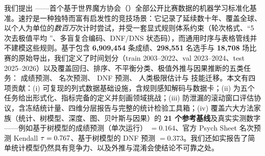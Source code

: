 我们提出 \wcabench{}——首个基于世界魔方协会（\wca）全部公开比赛数据的机器学习标准化基准。速拧是一种独特而富有启发性的竞技场景：它记录了延续数十年、覆盖全球、以个人为单位的\emph{数百万}次计时尝试，并受一套显式规则体系约束（轮次格式、“5 次去极值平均 ”、多盲复合编码、DNF/DNS 状态码），而通用时序与表格管线并不建模这些规则。基于包含 \textbf{6{,}909{,}454} 条成绩、\textbf{298{,}551} 名选手与 \textbf{18{,}708} 场比赛的原始导出，我们定义了时间划分（train 2003--2022、val 2023--2024、test 2025--2026）以及覆盖回归、排序、不平衡分类、极值外推与因果推断的五类任务： 成绩预测、 名次预测、 DNF 预测、 人类极限估计与  技能迁移。本文有四项贡献：(i) 可复现的列式数据基础设施，含规则感知解码与数据卡；(ii) 为五个任务给出形式化、指标完备的定义并刻画领域挑战；(iii) 防泄漏的滚动窗口评估协议，含冻结统计量、四维分层报告与完整的统计检验工具箱；(iv) 覆盖六大方法家族（统计、树模型、深度、图、贝叶斯与因果）的 \textbf{21 个参考基线}及真实实测数字——例如基于树模型的成绩预测（单次运行）\maelog{} $=0.164$、官方 Psych Sheet 名次预测 Kendall $\tau=0.767$、基于树模型的 DNF 预测 \aucpr{} $=0.373$。我们还如实报告了简单统计模型仍然具有竞争力、以及外推与混淆会使结论不可靠之处。
